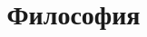\documentclass[a4paper]{report}
\title{Философия}
\begin{document}
\maketitle
\tableofcontents
\newpage

\chapter{}


\end{document}
